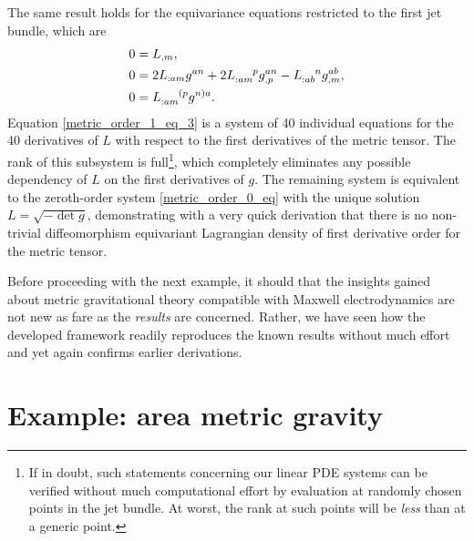 The same result holds for the equivariance equations restricted to the first jet bundle, which are
\begin{subequations}
  \begin{align}
    0 &{} = L_{,m}, \label{metric_order_1_eq_1}\\
    0 &{} = 2 L_{:am}g^{an} + 2 L_{:am}^{\hphantom{:am}p}g^{an}_{,p} - L_{:ab}^{\hphantom{:ab}n}g^{ab}_{,m}, \label{metric_order_1_eq_2}\\
    0 &{} = L_{:am}^{\hphantom{:am}(p}g^{n)a}. \label{metric_order_1_eq_3}
  \end{align}
\end{subequations}
Equation \ref{metric_order_1_eq_3} is a system of 40 individual equations for the 40 derivatives of $L$ with respect to the first derivatives of the metric tensor. The rank of this subsystem is full\footnote{If in doubt, such statements concerning our linear PDE systems can be verified without much computational effort by evaluation at randomly chosen points in the jet bundle. At worst, the rank at such points will be \emph{less} than at a generic point.}, which completely eliminates any possible dependency of $L$ on the first derivatives of $g$. The remaining system is equivalent to the zeroth-order system \eqref{metric_order_0_eq} with the unique solution $L=\sqrt{-\operatorname{det}g}$, demonstrating with a very quick derivation that there is no non-trivial diffeomorphism equivariant Lagrangian density of first derivative order for the metric tensor.

Before proceeding with the next example, it should that the insights gained about metric gravitational theory compatible with Maxwell electrodynamics are not new as fare as the \emph{results} are concerned. Rather, we have seen how the developed framework readily reproduces the known results without much effort and yet again confirms earlier derivations.

\section{Example: area metric gravity}

